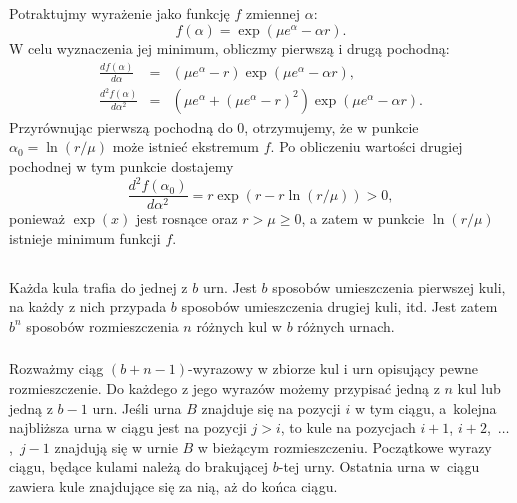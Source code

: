 \subsection{} %
Potraktujmy wyrażenie jako funkcję $f$ zmiennej $\alpha$:
\[
	f(\alpha) = \exp(\mu e^\alpha-\alpha r).
\]
W celu wyznaczenia jej minimum, obliczmy pierwszą i drugą pochodną:
\begin{eqnarray*}
	\frac{df(\alpha)}{d\alpha} &=& (\mu e^\alpha-r)\exp(\mu e^\alpha-\alpha r), \\
	\frac{d^2f(\alpha)}{d\alpha^2} &=& \left(\mu e^\alpha+(\mu e^\alpha-r)^2\right)\exp(\mu e^\alpha-\alpha r).
\end{eqnarray*}
Przyrównując pierwszą pochodną do 0, otrzymujemy, że w punkcie $\alpha_0=\ln(r/\mu)$ może istnieć ekstremum $f$. Po obliczeniu wartości drugiej pochodnej w tym punkcie dostajemy
\[
	\frac{d^2f(\alpha_0)}{d\alpha^2} = r\exp(r-r\ln(r/\mu)) > 0,
\]
ponieważ $\exp(x)$ jest rosnące oraz $r>\mu\ge0$, a zatem w punkcie $\ln(r/\mu)$ istnieje minimum funkcji $f$.

\problems

\subsection{} %

\subsubsection{} %
Każda kula trafia do jednej z $b$ urn. Jest $b$ sposobów umieszczenia pierwszej kuli, na każdy z nich przypada $b$ sposobów umieszczenia drugiej kuli, itd. Jest zatem $b^n$ sposobów rozmieszczenia $n$ różnych kul w $b$ różnych urnach.

\subsubsection{} %
Rozważmy ciąg $(b+n-1)$-wyrazowy w zbiorze kul i urn opisujący pewne rozmieszczenie. Do każdego z jego wyrazów możemy przypisać jedną z $n$ kul lub jedną z $b-1$ urn. Jeśli urna $B$ znajduje się na pozycji $i$ w tym ciągu, a~kolejna najbliższa urna w ciągu jest na pozycji $j>i$, to kule na pozycjach $i+1$, $i+2$,~$\dots$,~$j-1$ znajdują się w urnie $B$ w bieżącym rozmieszczeniu. Początkowe wyrazy ciągu, będące kulami należą do brakującej $b$-tej urny. Ostatnia urna w~ciągu zawiera kule znajdujące się za nią, aż do końca ciągu.

